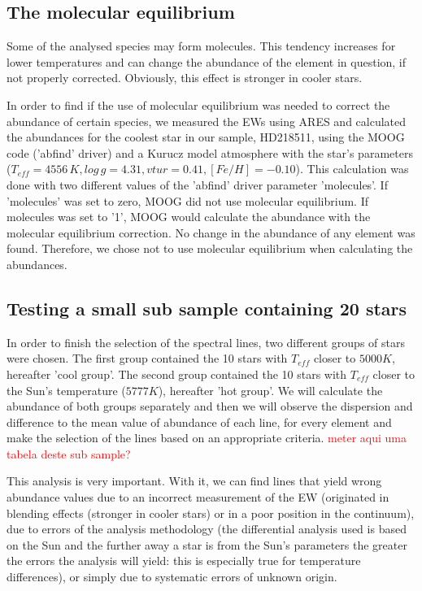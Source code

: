 \documentclass[dvips,12pt,a4paper]{report}
\begin{document}
{\subsection {The molecular equilibrium}

Some of the analysed species may form molecules. This tendency increases for lower temperatures and can change the abundance of the element in question, if not properly corrected. Obviously, this effect is stronger in cooler stars.

In order to find if the use of molecular equilibrium was needed to correct the abundance of certain species, we measured the EWs using ARES and calculated the abundances for the coolest star in our sample, HD218511, using the MOOG code ('abfind' driver) and a Kurucz model atmosphere with the star's parameters ($T_{eff}=4556\,K, log\,g=4.31, vtur=0.41, [Fe/H]=-0.10$).  This calculation was done with two different values of the 'abfind' driver parameter 'molecules'. If 'molecules' was set to zero, MOOG did not use molecular equilibrium. If molecules was set to '1', MOOG would calculate the abundance with the molecular equilibrium correction. No change in the abundance of any element was found. Therefore, we chose not to use molecular equilibrium when calculating the abundances.

\subsection {Testing a small sub sample containing 20 stars} 
\label{20stars}
In order to finish the selection of the spectral lines, two different groups of stars were chosen. The first group contained the 10 stars with $T_{eff}$ closer to $5000 K$, hereafter 'cool group'. The second group contained the 10 stars with $T_{eff}$ closer to the Sun's temperature ($5777 K$), hereafter 'hot group'. We will calculate the abundance of both groups separately and then we will observe the dispersion and difference to the mean value of abundance of each line, for every element and make the selection of the lines based on an appropriate criteria. \textcolor{red}{meter aqui uma tabela deste sub sample?}

This analysis is very important. With it, we can find lines that yield wrong abundance values due to an incorrect measurement of the EW (originated in blending effects (stronger in cooler stars) or in a poor position in the continuum), due to errors of the analysis methodology (the differential analysis used is based on the Sun and the further away a star is from the Sun's parameters the greater the errors the analysis will yield: this is especially true for temperature differences), or simply due to systematic errors of unknown origin.

}
\end{document}
